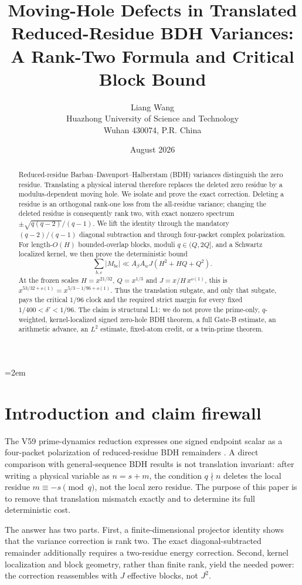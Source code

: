 \documentclass[11pt]{article}
\title{\textbf{Moving-Hole Defects in Translated Reduced-Residue BDH Variances:}\\
A Rank-Two Formula and Critical Block Bound}
\author{Liang Wang\\
Huazhong University of Science and Technology\\
Wuhan 430074, P.R. China}
\date{August 2026}
\begin{document}
\emergencystretch=2em
\maketitle

\begin{abstract}
Reduced-residue Barban--Davenport--Halberstam (BDH) variances distinguish the
zero residue.  Translating a physical interval therefore replaces the deleted
zero residue by a modulus-dependent moving hole.  We isolate and prove the
exact correction.  Deleting a residue is an orthogonal rank-one loss from the
all-residue variance; changing the deleted residue is consequently rank two,
with exact nonzero spectrum
$\pm\sqrt{q(q-2)}/(q-1)$.  We lift the identity through the mandatory
$(q-2)/(q-1)$ diagonal subtraction and through four-packet complex
polarization.  For length-$O(H)$ bounded-overlap blocks, moduli
$q\in(Q,2Q]$, and a Schwartz localized kernel, we then prove the deterministic
bound
\[
 \sum_{b,c}|M_{bc}|\ll A_\beta A_w J(H^2+HQ+Q^2).
\]
At the frozen scales $H=x^{21/32}$, $Q=x^{1/3}$ and
$J=x/H\,x^{o(1)}$, this is $x^{53/32+o(1)}=
x^{5/3-1/96+o(1)}$.  Thus the translation subgate, and only that subgate,
pays the critical $1/96$ clock and the required strict margin for every fixed
$1/400<\delta'<1/96$.  The claim is structural L1: we do not prove the
prime-only, $q$-weighted, kernel-localized signed zero-hole BDH theorem, a
full Gate-B estimate, an arithmetic advance, an $L^2$ estimate, fixed-atom
credit, or a twin-prime theorem.
\end{abstract}

\section{Introduction and claim firewall}

The V59 prime-dynamics reduction expresses one signed endpoint scalar as a
four-packet polarization of reduced-residue BDH remainders
\cite{V59Artifact}.  A direct comparison with general-sequence BDH results is
not translation invariant: after writing a physical variable as $n=s+m$,
the condition $q\nmid n$ deletes the local residue $m\equiv-s\pmod q$, not
the local zero residue.  The purpose of this paper is to remove that
translation mismatch exactly and to determine its full deterministic cost.

The answer has two parts.  First, a finite-dimensional projector identity
shows that the variance correction is rank two.  The exact diagonal-subtracted
remainder additionally requires a two-residue energy correction.  Second,
kernel localization and block geometry, rather than finite rank, yield the
needed power: the correction reassembles with $J$ effective blocks, not
$J^2$.
\end{document}
